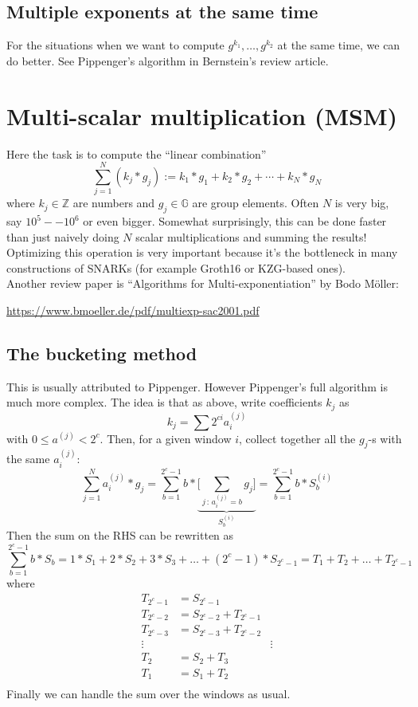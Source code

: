 \documentclass[12pt,draft,a4paper,openany,oneside]{amsbook}
\def\G{\mathbb{G}}
\def\Z{\mathbb{Z}}
\theoremstyle{plain}
\theoremstyle{definition}
\begin{document}

\subsection{Multiple exponents at the same time}
For the situations when we want to compute $g^{k_1},\dots, g^{k_2}$ at the same
time, we can do better. See Pippenger's algorithm in Bernstein's review article. 


\section{Multi-scalar multiplication (MSM)}

Here the task is to compute the ``linear combination''
\[ \sum_{j=1}^N (k_j*g_j) := k_1 * g_1 + k_2 * g_2 + \cdots + k_N * g_N \]
where $k_j\in\Z$ are numbers and $g_j\in\G$ are group elements.
Often $N$ is very big, say $10^5--10^6$ or even bigger.
Somewhat surprisingly, this can be done faster than just naively doing $N$
scalar multiplications and summing the results!\\

Optimizing this operation is very important because it's the bottleneck
in many constructions of SNARKs (for example Groth16 or KZG-based ones).\\

Another review paper is ``Algorithms for Multi-exponentiation'' by Bodo M\"oller:

\noindent
\url{https://www.bmoeller.de/pdf/multiexp-sac2001.pdf}

\subsection{The bucketing method}
This is usually attributed to Pippenger. However Pippenger's full algorithm
is much more complex. 
The idea is that as above, write coefficients $k_j$ as
\[ k_j = \sum 2^{ci} a^{(j)}_i \]
with $0 \le a^{(j)} < 2^c$.
Then, for a given window $i$, collect together all the $g_j$-s with the same
$a^{(j)}_i$:
\[ \sum_{j=1}^N a^{(j)}_i * g_j = \sum_{b=1}^{2^c-1} b * 
\underbrace{ \bigg[\sum_{j\,:\,a^{(j)}_i=b} g_j \bigg]}_{S^{(i)}_b}  = \sum_{b=1}^{2^c-1} b * S^{(i)}_b
\]
Then the sum on the RHS can be rewritten as 
\[ \sum_{b=1}^{2^c-1} b * S_b = 1*S_1 + 2*S_2 + 3*S_3 + \dots + (2^c-1)*S_{2^c-1} =
T_1 + T_2 + \dots + T_{2^c-1} \]
where 
\begin{align*}
T_{2^c-1} &= S_{2^c-1}  \\
T_{2^c-2} &= S_{2^c-2} + T_{2^c-1}  \\
T_{2^c-3} &= S_{2^c-3} + T_{2^c-2}  \\
\vdots & & \vdots \\
T_{2} &= S_{2} + T_{3}  \\
T_{1} &= S_{1} + T_{2}  \\
\end{align*}
Finally we can handle the sum over the windows as usual.\\
\end{document}
